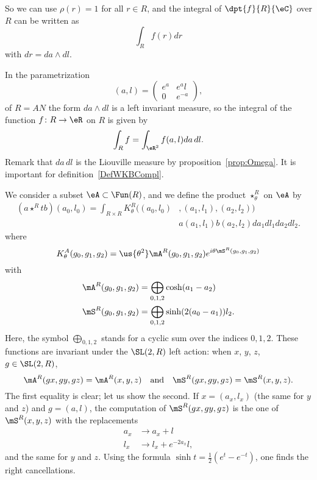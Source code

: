 So we can use $\rho(r)=1$ for all $r\in R$, and the integral of $\dpt{f}{R}{\eC}$ over $R$ can be written as
\[
	\int_Rf(r)dr
\]
with $dr=da\wedge dl$.

In the parametrization
\[
	(a,l)=\begin{pmatrix}
		e^{a} & e^{a}l \\
		0     & e^{-a}
	\end{pmatrix},
\]
of $R=AN$ the form $da\wedge dl$ is a left invariant measure, so the integral of the function $f\colon R\to \eR$ on $R$ is given by
\[
	\int_R f=\int_{\eR^2} f(a,l)da\,dl.
\]
Remark that $da\,dl$ is the Liouville measure by proposition~\ref{prop:Omega}. It is important for definition~\ref{DefWKBCompl}.

We consider a subset $\eA\subset\Fun(R)$, and we define the product $\star^{R}_{\theta}$ on $\eA$ by
\begin{equation}\label{eq:star_R}
	\begin{split}
		(a\star^{R}t b)(a_0,l_0)
		=\int_{R\times R}K^R_{\theta}\big((a_0,l_0)&,(a_1,l_1),(a_2,l_2)\big)\\
		&a(a_1,l_1)b(a_2,l_2)da_1dl_1da_2dl_2.
	\end{split}
\end{equation}
where
\[
	K_{\theta}^A(g_0,g_1,g_2)=\us{\theta^2}\mA^R(g_0,g_1,g_2)e^{i\theta \mS^R(g_0,g_1,g_2)}
\]
with
\begin{subequations}
	\begin{align}
		\mA^R(g_0,g_1,g_2) & =\bigoplus_{0,1,2}\cosh(a_1-a_2)        \\
		\mS^R(g_0,g_1,g_2) & =\bigoplus_{0,1,2}\sinh(2(a_0-a_1))l_2.
	\end{align}
\end{subequations}
Here, the symbol $\bigoplus_{0,1,2}$ stands for a cyclic sum over the indices $0,1,2$.
These functions are invariant under the $\SL(2,R)$ left action: when $x$, $y$, $z$, $g\in\SL(2,R)$,
\begin{equation}
	\mA^R(gx,gy,gz)=\mA^R(x,y,z)\quad\text{and}\quad \mS^R(gx,gy,gz)=\mS^R(x,y,z).
\end{equation}
The first equality is clear; let us show the second. If $x=(a_x,l_x)$ (the same for $y$ and $z$) and $g=(a,l)$, the computation of $\mS^R(gx,gy,gz)$ is the one of $\mS^R(x,y,z)$ with the replacements
\begin{subequations}
	\begin{align}
		a_x & \rightarrow a_x+l           \\
		l_x & \rightarrow l_x+e^{-2a_x}l,
	\end{align}
\end{subequations}
and the same for $y$ and $z$. Using the formula $\sinh t=\frac{1}{2}(e^{t}-e^{-t})$, one finds the right cancellations.

